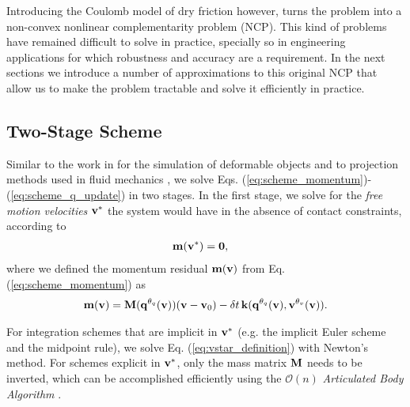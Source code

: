 Introducing the Coulomb model of dry friction however, turns the problem into a
non-convex nonlinear complementarity problem (NCP). This kind of problems have
remained difficult to solve in practice, specially so in engineering
applications for which robustness and accuracy are a requirement. In the next
sections we introduce a number of approximations to this original NCP that allow
us to make the problem tractable and solve it efficiently in practice.

\subsection{Two-Stage Scheme}

Similar to the work in \cite{bib:duriez2005realistic} for the simulation of
deformable objects and to projection methods used in fluid mechanics
\cite{bib::bell1991efficient}, we solve Eqs.
(\ref{eq:scheme_momentum})-(\ref{eq:scheme_q_update}) in two stages. In the
first stage, we solve for the \emph{free motion velocities} ${\mathbf{v}}^*$ the
system would have in the absence of contact constraints, according to
\begin{align}
	\mf{m}(\mf{v}^*) &= \mf{0},
	\label{eq:vstar_definition}
\end{align}
where we defined the momentum residual ${\mathbf{m}}({\mathbf{v}})$ from Eq.
(\ref{eq:scheme_momentum}) as
\begin{multline}
	\mf{m}(\mf{v}) =
	\mf{M}(\mf{q}^{\theta_{q}}(\mf{v}))(\mf{v}-\mf{v}_0) -
	\delta t\,\mf{k}(\mf{q}^{\theta_{q}}(\mf{v}),\mf{v}^{\theta_v}(\mf{v})).
	\label{eq:m_definition}
\end{multline}

For integration schemes that are implicit in ${\mathbf{v}}^*$ (e.g. the implicit Euler
scheme and the midpoint rule), we solve Eq. (\ref{eq:vstar_definition}) with
Newton's method. For schemes explicit in ${\mathbf{v}}^*$, only the mass matrix
${\mathbf{M}}$ needs to be inverted, which can be accomplished efficiently using the
$\mathcal{O}(n)$ \emph{Articulated Body Algorithm}
\cite{bib:featherstone2008_rigid_body_dynamics_algorithms}.

